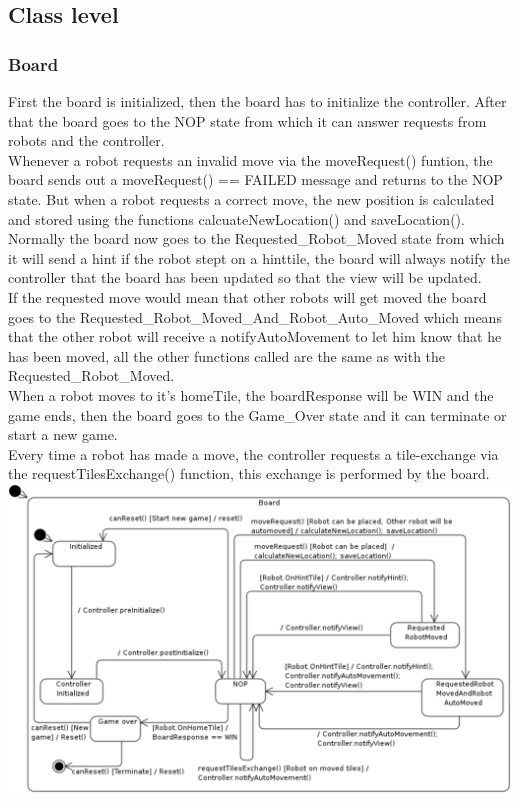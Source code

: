 \subsection{Class level}
	\subsubsection{Board}
	First the board is initialized, then the board has to initialize the controller. After that the board goes to the NOP state from which it can answer requests from robots and the controller. \\
Whenever a robot requests an invalid move via the moveRequest() funtion, the board sends out a moveRequest() == FAILED message and returns to the NOP state. But when a robot requests a correct move, the new position is calculated and stored using the functions calcuateNewLocation() and saveLocation(). \\
Normally the board now goes to the Requested_Robot_Moved state from which it will send a hint if the robot stept on a hinttile, the board will always notify the controller that the board has been updated so that the view will be updated.\\
If the requested move would mean that other robots will get moved the board goes to the Requested_Robot_Moved_And_Robot_Auto_Moved which means that the other robot will receive a notifyAutoMovement to let him know that he has been moved, all the other functions called are the same as with the Requested_Robot_Moved.\\
When a robot moves to it's homeTile, the boardResponse will be WIN and the game ends, then the board goes to the Game_Over state and it can terminate or start a new game.\\
Every time a robot has made a move, the controller requests a tile-exchange via the requestTilesExchange() function, this exchange is performed by the board.\\
	
	\includegraphics[width=\linewidth]{statecharts/board.pdf}

